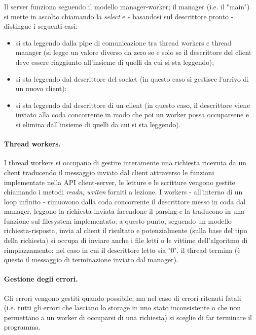 \documentclass[11pt, italian, openany]{book}
\begin{document}
\begin{sloppypar}
Il server funziona seguendo il modello manager-worker; il manager (i.e. il "main") si mette in ascolto chiamando la
\textit{select} e - basandosi sul descrittore pronto - distingue i seguenti casi:
\begin{itemize}[topsep=0pt]
\itemsep-0.3em
    \item si sta leggendo dalla pipe di comunicazione tra thread workers e thread manager (si legge un valore diverso da zero
    se e solo se il descrittore del client deve essere riaggiunto all'insieme di quelli da cui si sta leggendo);
    \item si sta leggendo dal descrittore del socket (in questo caso si gestisce l'arrivo di un nuovo client);
    \item si sta leggendo dal descrittore di un client (in questo caso, il descrittore viene inviato alla coda concorrente in modo
    che poi un worker possa occuparsene e si elimina dall'insieme di quelli da cui si sta leggendo).
\end{itemize}

\paragraph*{Thread workers.}
I thread workers si occupano di gestire interamente una richiesta ricevuta da un client traducendo il messaggio inviato dal client
attraverso le funzioni implementate nella API client-server, le letture e le scritture vengono gestite chiamando i metodi
\textit{readn}, \textit{writen} forniti a lezione. I workers - all'interno di un loop infinito - rimuovono dalla coda concorrente
il descrittore messo in coda dal manager, leggono la richiesta inviata facendone il parsing e la traducono in una funzione
sul filesystem implementato; a questo punto, seguendo un modello richiesta-risposta, invia al client il risultato e potenzialmente
(sulla base del tipo della richiesta) si occupa di inviare anche i file letti o le vittime dell'algoritmo di rimpiazzamento; nel
caso in cui il descrittore letto sia "0", il thread termina (\`e questo il messaggio di terminazione inviato dal manager).

\paragraph*{Gestione degli errori.}
Gli errori vengono gestiti quando possibile, ma nel caso di errori ritenuti fatali (i.e. tutti gli errori che lasciano lo storage
in uno stato inconsistente o che non permettano a un worker di occuparsi di una richiesta) si sceglie di far terminare il programma.


\end{sloppypar}
\end{document}

